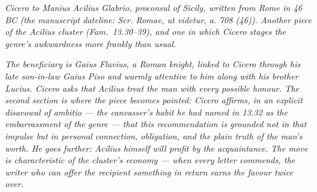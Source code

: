 
\textit{Cicero to Manius Acilius Glabrio, proconsul of
Sicily, written from Rome in 46 BC (the manuscript
dateline: \textit{Scr. Romae, ut videtur, a. 708 (46)}).
Another piece of the Acilius cluster
(Fam.\ 13.30--39), and one in which Cicero stages the
genre's awkwardness more frankly than usual.}

\textit{The beneficiary is Gaius Flavius, a Roman knight,
linked to Cicero through his late son-in-law Gaius Piso
and warmly attentive to him along with his brother
Lucius. Cicero asks that Acilius treat the man with
every possible honour. The second section is where the
piece becomes pointed: Cicero affirms, in an explicit
disavowal of \textit{ambitio} --- the canvasser's habit
he had named in 13.32 as the embarrassment of the
genre --- that this recommendation is grounded not in
that impulse but in personal connection, obligation,
and the plain truth of the man's worth. He goes further:
Acilius himself will profit by the acquaintance. The
move is characteristic of the cluster's economy ---
when every letter commends, the writer who can offer
the recipient something in return earns the favour
twice over.}
